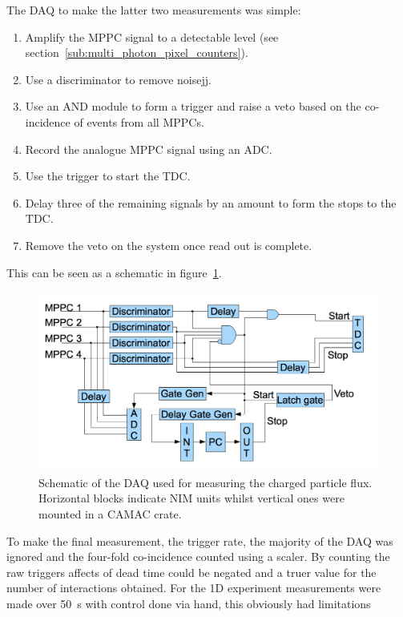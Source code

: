 The DAQ to make the latter two measurements was simple:
\begin{enumerate}
    \item Amplify the MPPC signal to a detectable level (see section~\ref{sub:multi_photon_pixel_counters}).
    \item Use a discriminator to remove noisejj.
    \item Use an AND module to form a trigger and raise a veto based on the co-incidence of events from all MPPCs.
    \item Record the analogue MPPC signal using an ADC.
    \item Use the trigger to start the TDC.
    \item Delay three of the remaining signals by an amount to form the stops to the TDC.
    \item Remove the veto on the system once read out is complete.
\end{enumerate}
This can be seen as a schematic in figure~\ref{fig:MuSIC1_DAQ_Block}. 

\begin{figure}[hptb]
    \centering
        \includegraphics[width=.9\textwidth]{images/charged_flux/MuSIC1_DAQ_Block.png}
    \caption{Schematic of the DAQ used for measuring the charged particle flux. Horizontal blocks indicate NIM units whilst vertical ones were mounted in a CAMAC crate.}
    \label{fig:MuSIC1_DAQ_Block}
\end{figure}

To make the final measurement, the trigger rate, the majority of the DAQ was ignored and the four-fold co-incidence counted using a scaler. By counting the raw triggers affects of dead time could be negated and a truer value for the number of interactions obtained. For the 1D experiment measurements were made over 50~s with control done via hand, this obviously had limitations 

